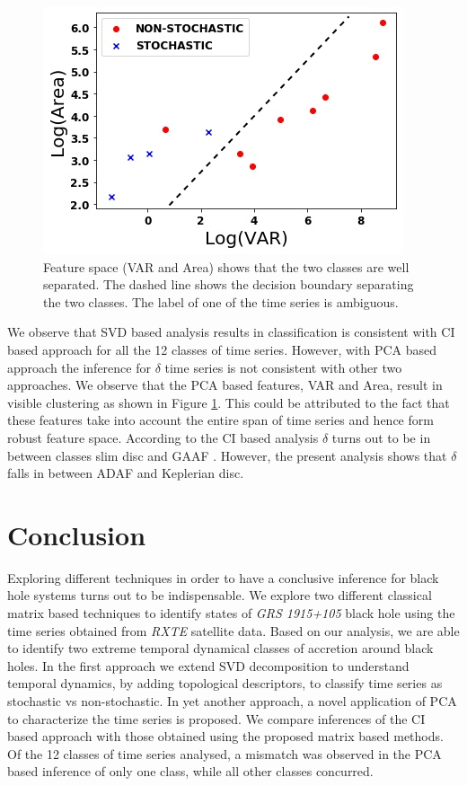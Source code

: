 \documentclass[10pt,conference]{IEEEtran}
\begin{document}
\begin{figure}
  \centering
  \includegraphics[width=.9\linewidth]{variance_area.drawio.png}
  \caption{Feature space (VAR and Area) shows that the two classes are well separated. The dashed line shows the decision boundary separating the two classes. The label of one of the time series is ambiguous.}
  \label{fig:variance_area_fs}
\end{figure}
We observe that SVD based analysis results in classification  is consistent with CI based approach for all the 12 classes of time series. However, with PCA based approach the inference for  $\delta$ time series is not consistent with other two approaches. We observe that the PCA based features, VAR and Area, result in visible clustering as shown in Figure \ref{fig:variance_area_fs}. This could be attributed to the fact that   these features take into account the entire span of time series and hence form robust feature space. According to the CI based analysis $\delta$ turns out to be in between classes slim disc  and GAAF \cite{Adegoke2018}. However, the present analysis shows that $\delta$ falls in between ADAF and Keplerian disc.


\section{Conclusion}
Exploring different techniques in order to have a conclusive inference for black hole systems turns out to be indispensable. We explore two different classical matrix based techniques to identify states of \textit{GRS 1915+105} black hole using the time series obtained from \textit{RXTE} satellite data. Based on our analysis, we are able to identify two extreme temporal dynamical classes of accretion around black holes. In the first approach we extend  SVD decomposition to understand temporal dynamics,  by adding  topological descriptors, to classify time series as stochastic vs non-stochastic. In yet another approach, a novel application of  PCA  to characterize the time series is proposed. We compare inferences of the CI based approach with those obtained using the proposed matrix based methods. Of the 12 classes of time series analysed, a mismatch was observed in the PCA based inference of only one class, while all other classes concurred.
\end{document}
